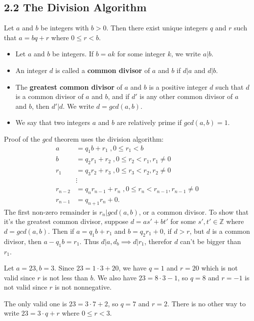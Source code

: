 \documentclass{article}
\newcommand{\Z}{\mathbb{Z}}
\begin{document}
\subsection{2.2 The Division Algorithm}
\begin{definition}
  Let $a$ and $b$ be integers with $b>0$. Then there exist unique integers $q$ and $r$ such that $a=bq+r$ where $0\leq r<b$.

  \begin{itemize}
    \item Let $a$ and $b$ be integers. If $b=ak$ for some integer $k$, we write $a|b$.
    \item An integer $d$ is called a \textbf{common divisor} of $a$ and $b$ if $d|a$ and $d|b$.
    \item The \textbf{greatest common divisor} of $a$ and $b$ is a positive integer $d$ such that $d$ is a common divisor of $a$ and $b$, and if $d'$ is any other common divisor of $a$ and $b$, then $d'|d$. We write $d=gcd(a,b)$.
    \item We say that two integers $a$ and $b$ are relatively prime if $gcd(a,b)=1$.
  \end{itemize}

\end{definition}
Proof of the $gcd$ theorem uses the division algorithm:
\begin{align*}
  a &= q_1b+r_1\;, 0\leq r_1 < b\\
  b&=q_2r_1+r_2\;, 0\leq r_2<r_1, r_1\neq0\\
  r_1&=q_3r_2+r_3\;, 0\leq r_3<r_2, r_2\neq0\\
  &\vdots\\
  r_{n-2}&=q_nr_{n-1}+r_n\;, 0\leq r_n<r_{n-1}, r_{n-1}\neq0\\
  r_{n-1}&=q_{n+1}r_n+0.
\end{align*}
The first non-zero remainder is $r_n|gcd(a,b)$, or a common divisor. To show that it's the greatest common divisor, suppose $d=as'+bt'$ for some $s',t'\in\Z$ where $d=gcd(a,b)$. Then if $a=q_1b+r_1$ and $b=q_2r_1+0$, if $d>r$, but $d$ is a common divisor, then $a-q_1b=r_1$. Thus $d|a,d_b\implies d|r_1$, therefor $d$ can't be bigger than $r_1.$
\begin{example}
  Let $a=23, b=3$. Since $23=1\cdot3+20$, we have $q=1$ and $r=20$ which is not valid since $r$ is not less than $b$. We also have $23=8\cdot3-1$, so $q=8$ and $r=-1$ is not valid since $r$ is not nonnegative.

  The only valid one is $23=3\cdot7+2$, so $q=7$ and $r=2$. There is no other way to write $23=3\cdot q+r$ where $0\leq r<3$.
\end{example}
\end{document}

